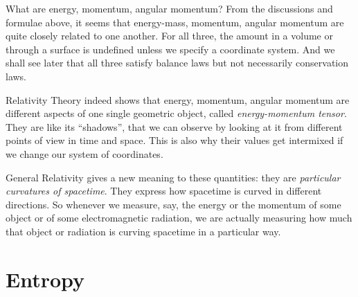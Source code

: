 \documentclass[a4paper,12pt,%
onecolumn,oneside,titlepage,%
british%
]{memoir}
\newcommand{\mynotew}[1]{{\footnotesize\color{midgrey}\faIcon{tools}\ #1}}
\renewcommand*{\|}[1][]{\nonscript\:#1\vert\nonscript\:\mathopen{}}
\newcommand*{\sect}{\S}%
\newcommand*{\energym}{energy-mass}
\begin{document}
\begin{extra}{{What are energy, momentum, angular momentum?}}
From the discussions and formulae above, it seems that \energym, momentum, angular momentum are quite closely related to one another. For all three, the amount in a volume or through a surface is undefined unless we specify a coordinate system. And we shall see later that all three satisfy balance laws but not necessarily conservation laws.

  Relativity Theory indeed shows that energy, momentum, angular momentum are different aspects of one single geometric object, called \emph{energy-momentum tensor}. They are like its \enquote{shadows}, that we can observe by looking at it from different points of view in time and space. This is also why their values get intermixed if we change our system of coordinates. %

  General Relativity gives a new meaning to these quantities: they are \emph{particular curvatures of spacetime}. They express how spacetime is curved in different directions. So whenever we measure, say, the energy or the momentum of some object or of some electromagnetic radiation, we are actually measuring how much that object or radiation is curving spacetime in a particular way. %
\end{extra}
%

\section{Entropy}
\label{sec:intro_entropy}
\end{document}
